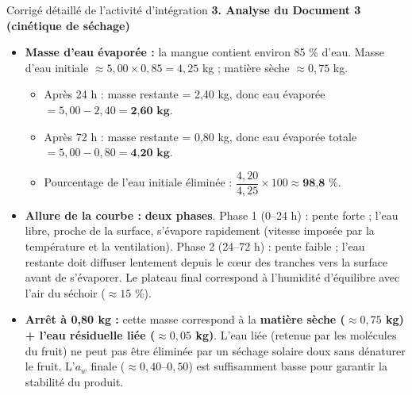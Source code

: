 \documentclass[11pt]{article}
\begin{document}
\begin{exoresolu}{Corrigé détaillé de l'activité d'intégration}
\noindent\textbf{3. Analyse du Document 3 (cinétique de séchage)}
\begin{itemize}
    \item \textbf{Masse d'eau évaporée :} la mangue contient environ 85 \% d'eau. Masse d'eau initiale $\approx 5,00 \times 0,85 = 4,25$ kg ; matière sèche $\approx 0,75$ kg.
    \begin{itemize}
        \item Après 24 h : masse restante = 2,40 kg, donc eau évaporée $= 5,00 - 2,40 = \textbf{2,60 kg}$.
        \item Après 72 h : masse restante = 0,80 kg, donc eau évaporée totale $= 5,00 - 0,80 = \textbf{4,20 kg}$.
        \item Pourcentage de l'eau initiale éliminée : $\dfrac{4,20}{4,25} \times 100 \approx \textbf{98,8 \%}$.
    \end{itemize}
    \item \textbf{Allure de la courbe :} \textbf{deux phases}. Phase 1 (0--24 h) : pente forte ; l'eau libre, proche de la surface, s'évapore rapidement (vitesse imposée par la température et la ventilation). Phase 2 (24--72 h) : pente faible ; l'eau restante doit diffuser lentement depuis le cœur des tranches vers la surface avant de s'évaporer. Le plateau final correspond à l'humidité d'équilibre avec l'air du séchoir ($\approx 15$ \%).
    \item \textbf{Arrêt à 0,80 kg :} cette masse correspond à la \textbf{matière sèche ($\approx 0,75$ kg) + l'eau résiduelle liée ($\approx 0,05$ kg)}. L'eau liée (retenue par les molécules du fruit) ne peut pas être éliminée par un séchage solaire doux sans dénaturer le fruit. L'$a_w$ finale ($\approx 0,40$--$0,50$) est suffisamment basse pour garantir la stabilité du produit.
\end{itemize}


\end{exoresolu}
\end{document}
